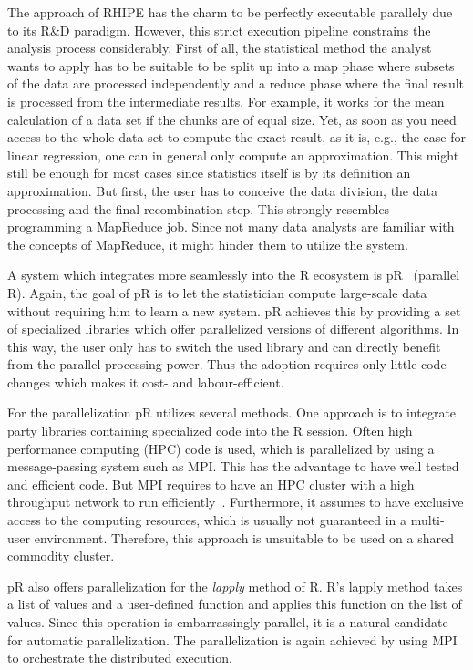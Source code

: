 The approach of RHIPE has the charm to be perfectly executable parallely due to its R\&D paradigm.
However, this strict execution pipeline constrains the analysis process considerably.
First of all, the statistical method the analyst wants to apply has to be suitable to be split up into a map phase where subsets of the data are processed independently and a reduce phase where the final result is processed from the intermediate results.
For example, it works for the mean calculation of a data set if the chunks are of equal size.
Yet, as soon as you need access to the whole data set to compute the exact result, as it is, e.g., the case for linear regression, one can in general only compute an approximation.
This might still be enough for most cases since statistics itself is by its definition an approximation.
But first, the user has to conceive the data division, the data processing and the final recombination step.
This strongly resembles programming a MapReduce job.
Since not many data analysts are familiar with the concepts of MapReduce, it might hinder them to utilize the system.

A system which integrates more seamlessly into the R ecosystem is pR~\cite{samatova:2009a} (parallel R).
Again, the goal of pR is to let the statistician compute large-scale data without requiring him to learn a new system.
pR achieves this by providing a set of specialized libraries which offer parallelized versions of different algorithms.
In this way, the user only has to switch the used library and can directly benefit from the parallel processing power.
Thus the adoption requires only little code changes which makes it cost- and labour-efficient.

For the parallelization pR utilizes several methods.
One approach is to integrate  party libraries containing specialized code into the R session.
Often high performance computing (HPC) code is used, which is parallelized by using a message-passing system such as MPI.
This has the advantage to have well tested and efficient code.
But MPI requires to have an HPC cluster with a high throughput network to run efficiently~\cite{sur:2006a}.
Furthermore, it assumes to have exclusive access to the computing resources, which is usually not guaranteed in a multi-user environment.
Therefore, this approach is unsuitable to be used on a shared commodity cluster.

pR also offers parallelization for the \emph{lapply} method of R.
R's lapply method takes a list of values and a user-defined function and applies this function on the list of values.
Since this operation is embarrassingly parallel, it is a natural candidate for automatic parallelization.
The parallelization is again achieved by using MPI to orchestrate the distributed execution.

